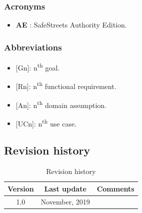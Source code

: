 \documentclass{article}
\begin{document}
			\subsubsection{Acronyms}
				\begin{itemize}
					\item \textbf{AE} \label{AE}: SafeStreets Authority Edition.
				\end{itemize}
			\subsubsection{Abbreviations}
				\begin{itemize}
					\item {[Gn]}: n\textsuperscript{th} goal.
					\item {[Rn]}: n\textsuperscript{th} functional requirement.
					\item {[An]}: n\textsuperscript{th} domain assumption.
					\item {[UCn]}: n\textsuperscript{th} use case.
				\end{itemize}
		\subsection{Revision history}
			\begin{table}[h]
				\centering
				\begin{tabular}{c c c}
					\hline
					\textbf{Version} & \textbf{Last update} & \textbf{Comments} \\ 
					\hline
					1.0 &  \nth{10} November, 2019  & \\
					\hline
				\end{tabular}
				\caption{Revision history}
				\label{fig:Revision history}
			\end{table}
			
\end{document}
